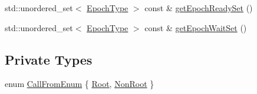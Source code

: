 \begin{DoxyCompactItemize}
\item 
std\+::unordered\+\_\+set$<$ \hyperlink{namespacevt_a985a5adf291c34a3ca263b3378388236}{Epoch\+Type} $>$ const  \& \hyperlink{structvt_1_1term_1_1_termination_detector_a8eb6730fc343957d0a788919b641762e}{get\+Epoch\+Ready\+Set} ()
\item 
std\+::unordered\+\_\+set$<$ \hyperlink{namespacevt_a985a5adf291c34a3ca263b3378388236}{Epoch\+Type} $>$ const  \& \hyperlink{structvt_1_1term_1_1_termination_detector_aed77c0e79a681705e941314e7415df35}{get\+Epoch\+Wait\+Set} ()
\end{DoxyCompactItemize}
\subsection*{Private Types}
\begin{DoxyCompactItemize}
\item 
enum \hyperlink{structvt_1_1term_1_1_termination_detector_a4f3ede9a87f39d86e85f92b36a6c6a30}{Call\+From\+Enum} \{ \hyperlink{structvt_1_1term_1_1_termination_detector_a4f3ede9a87f39d86e85f92b36a6c6a30a4beac8e3ddc4064785a61aa7949e3bda}{Root}, 
\hyperlink{structvt_1_1term_1_1_termination_detector_a4f3ede9a87f39d86e85f92b36a6c6a30a73c8bf8079c6c90553937f74f98c99fc}{Non\+Root}
 \}
\end{DoxyCompactItemize}
